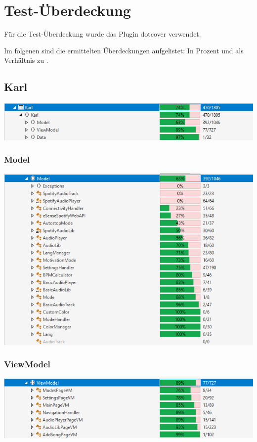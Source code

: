 \documentclass[../validierung.tex]{subfiles}
\begin{document}
\section{Test-Überdeckung}
	Für die Test-Überdeckung wurde das Plugin \gls{dotcover} verwendet.

	Im folgenen sind die ermittelten Überdeckungen aufgelistet:
	In Prozent und als Verhältnis  zu .
	\subsection{Karl}
		\includegraphics[width=\textwidth]{karl.png}
			\subsubsection{Model}
				\includegraphics[width=\textwidth]{model.png}
			\subsubsection{ViewModel}
				\includegraphics[width=\textwidth]{vm.png}
\end{document}

